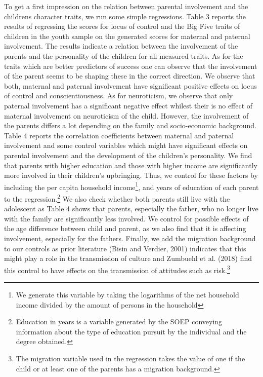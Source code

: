 \documentclass[%
    a4paper,            %
    11pt,               %
    bibliography=totoc, %
]
{scrartcl}
\begin{document}
To get a first impression on the relation between parental involvement and the childrens character traits, we run some simple regressions. 
Table 3 reports the results of regressing the scores for locus of control and the Big Five traits of children in the youth sample on the generated scores for maternal and paternal involvement. The results indicate a relation between the involvement of the parents and the personality of the children for all measured traits. As for the traits which are better predictors of success one can observe that the involvement of the parent seems to be shaping these in the correct direction. We observe that both, maternal and paternal involvement have significant positive effects on locus of control and conscientiousness. As for neuroticism, we observe that only paternal involvement has a significant negative effect whilest their is no effect of maternal involvement on neuroticism of the child. \newline 
However, the involvement of the parents differs a lot depending on the family and socio-economic background. Table 4 reports the correlation coefficients between maternal and paternal involvement and some control variables which might have significant effects on parental involvement and the development of the children's personality. We find that parents with higher education and those with higher income are significantly more involved in their children's upbringing. Thus, we control for these factors by including the per capita household income\footnote{We generate this variable by taking the logarithms of the net household income divided by the amount of persons in the household}, and years of education of each parent to the regression.\footnote{Education in years is a variable generated by the SOEP conveying information about the type of education pursuit by the individual and the degree obtained.} We also check whether both parents still live with the adolescent as Table 4 shows that parents, especially the father, who no longer live with the family are significantly less involved. We control for possible effects of the age difference between child and parent, as we also find that it is affecting involvement, especially for the fathers.  Finally, we add the migration background to our controls as prior literature (Bisin and Verdier, 2001) indicates that this might play a role in the transmission of culture and Zumbuehl et al. (2018) find this control to have effects on the transmission of attitudes such as risk.\footnote{The migration variable used in the regression takes the value of one if the child or at least one of the parents has a migration background.}
\end{document}
